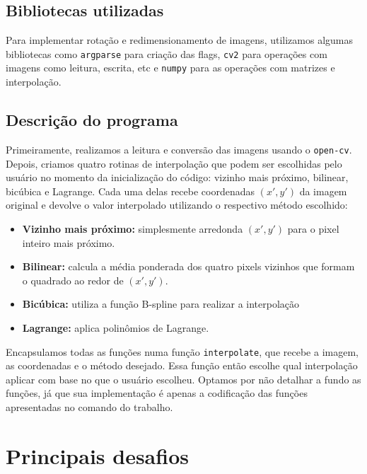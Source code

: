 \documentclass{article}
\begin{document}
    \subsection{Bibliotecas utilizadas}\label{subsec:bibliotecas-transformacao}
    Para implementar rotação e redimensionamento de imagens, utilizamos algumas bibliotecas como
    \texttt{argparse} para criação das flags, \texttt{cv2} para operações com imagens como leitura, escrita, etc e
    \texttt{numpy} para as operações com matrizes e interpolação.

    \subsection{Descrição do programa}\label{subsec:descricao-transformacao}
    Primeiramente, realizamos a leitura e conversão das imagens usando o \texttt{open-cv}.
    Depois, criamos quatro rotinas de interpolação que podem ser escolhidas pelo usuário no momento da inicialização do código:
    vizinho mais próximo, bilinear, bicúbica e Lagrange.
    Cada uma delas recebe coordenadas \((x',y')\) da imagem original e devolve o valor interpolado utilizando o respectivo método escolhido:

    \begin{itemize}
        \item \textbf{Vizinho mais próximo:} simplesmente arredonda \((x',y')\) para o pixel inteiro mais próximo.
        \item \textbf{Bilinear:} calcula a média ponderada dos quatro pixels vizinhos que formam o quadrado ao redor de \((x',y')\).
        \item \textbf{Bicúbica:} utiliza a função B-spline para realizar a interpolação
        \item \textbf{Lagrange:} aplica polinômios de Lagrange.
    \end{itemize}

    Encapsulamos todas as funções numa função \texttt{interpolate}, que recebe a imagem, as coordenadas e o método desejado.
    Essa função então escolhe qual interpolação aplicar com base no que o usuário escolheu.
    Optamos por não detalhar a fundo as funções, já que sua implementação é apenas a codificação das funções apresentadas no comando do trabalho.


    \section{Principais desafios}\label{sec:principais-desafios}
\end{document}
